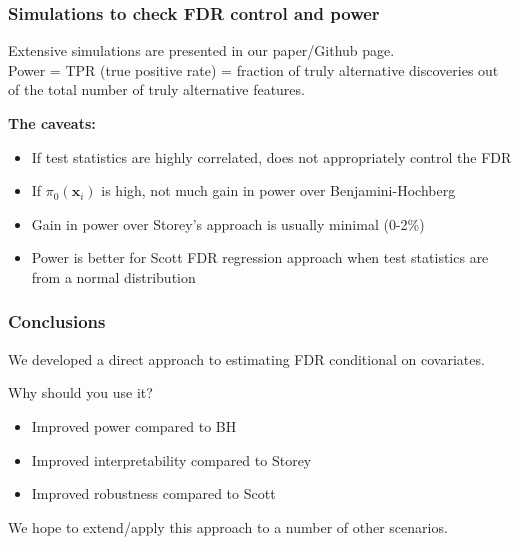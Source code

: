 \documentclass{beamer}
\newcommand{\bx}{\mathbf{x}}
\begin{document}

\begin{frame}
\frametitle{Simulations to check FDR control and power}

Extensive simulations are presented in our paper/Github page.\\ \vspace{0.2cm}
Power = TPR (true positive rate) = fraction of truly alternative discoveries out of the total number of truly alternative features. \\
\vspace{0.5cm}

\textbf{The caveats:}

\begin{itemize}
\item If test statistics are highly correlated, does not appropriately control the FDR
\item If $\pi_0(\bx_i)$ is high, not much gain in power over Benjamini-Hochberg
\item Gain in power over Storey's approach is usually minimal (0-2\%)
\item Power is better for Scott FDR regression approach when test statistics are from a normal distribution
\end{itemize}

\end{frame}


\begin{frame}
\frametitle{Conclusions}

We developed a direct approach to estimating FDR conditional on covariates.

Why should you use it?
\begin{itemize}
\item Improved power compared to BH
\item Improved interpretability compared to Storey
\item Improved robustness compared to Scott
\end{itemize}

We hope to extend/apply this approach to a number of other scenarios.

\end{frame}

\end{document}
